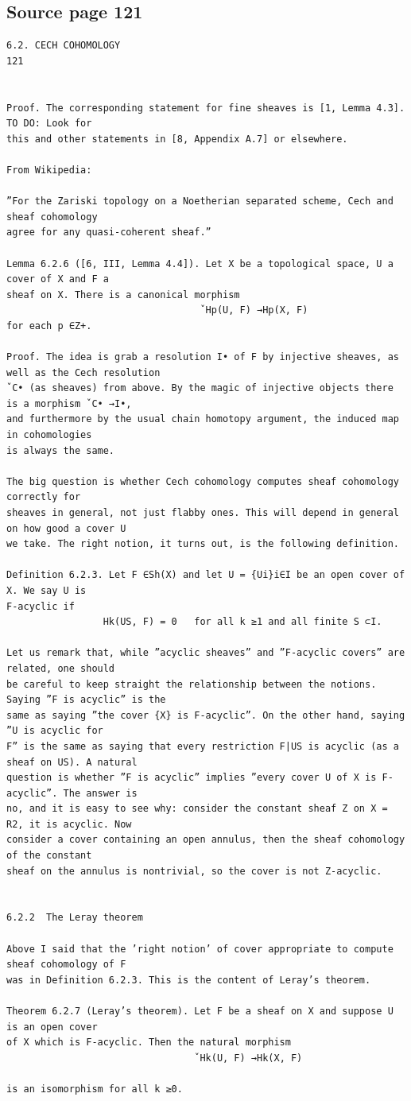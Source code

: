 \subsection*{Source page 121}
\begin{Verbatim}[fontsize=\small]
6.2. CECH COHOMOLOGY                                                   121


Proof. The corresponding statement for fine sheaves is [1, Lemma 4.3]. TO DO: Look for
this and other statements in [8, Appendix A.7] or elsewhere.

From Wikipedia:

”For the Zariski topology on a Noetherian separated scheme, Cech and sheaf cohomology
agree for any quasi-coherent sheaf.”

Lemma 6.2.6 ([6, III, Lemma 4.4]). Let X be a topological space, U a cover of X and F a
sheaf on X. There is a canonical morphism
                                  ˇHp(U, F) →Hp(X, F)
for each p ∈Z+.

Proof. The idea is grab a resolution I• of F by injective sheaves, as well as the Cech resolution
ˇC• (as sheaves) from above. By the magic of injective objects there is a morphism ˇC• →I•,
and furthermore by the usual chain homotopy argument, the induced map in cohomologies
is always the same.

The big question is whether Cech cohomology computes sheaf cohomology correctly for
sheaves in general, not just flabby ones. This will depend in general on how good a cover U
we take. The right notion, it turns out, is the following definition.

Definition 6.2.3. Let F ∈Sh(X) and let U = {Ui}i∈I be an open cover of X. We say U is
F-acyclic if
                 Hk(US, F) = 0   for all k ≥1 and all finite S ⊂I.

Let us remark that, while ”acyclic sheaves” and ”F-acyclic covers” are related, one should
be careful to keep straight the relationship between the notions. Saying ”F is acyclic” is the
same as saying ”the cover {X} is F-acyclic”. On the other hand, saying ”U is acyclic for
F” is the same as saying that every restriction F|US is acyclic (as a sheaf on US). A natural
question is whether ”F is acyclic” implies ”every cover U of X is F-acyclic”. The answer is
no, and it is easy to see why: consider the constant sheaf Z on X = R2, it is acyclic. Now
consider a cover containing an open annulus, then the sheaf cohomology of the constant
sheaf on the annulus is nontrivial, so the cover is not Z-acyclic.


6.2.2  The Leray theorem

Above I said that the ’right notion’ of cover appropriate to compute sheaf cohomology of F
was in Definition 6.2.3. This is the content of Leray’s theorem.

Theorem 6.2.7 (Leray’s theorem). Let F be a sheaf on X and suppose U is an open cover
of X which is F-acyclic. Then the natural morphism
                                 ˇHk(U, F) →Hk(X, F)

is an isomorphism for all k ≥0.
\end{Verbatim}

